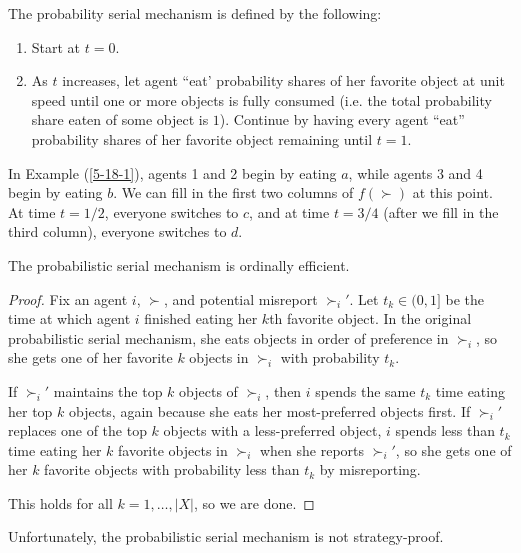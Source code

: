 \begin{definition}
	The probability serial mechanism is defined by the following:
	\begin{enumerate}[label = (\roman*)]
		\item Start at $t=0$. 
		\item As $t$ increases, let agent ``eat' probability shares of her favorite object at unit speed until one or more objects is fully consumed (i.e. the total probability share eaten of some object is $1$). Continue by having every agent ``eat'' probability shares of her favorite object remaining until $t=1$.
	\end{enumerate}
\end{definition}

In Example (\ref{5-18-1}), agents 1 and 2 begin by eating $a$, while agents 3 and 4 begin by eating $b$. We can fill in the first two columns of $f(\succ)$ at this point. At time $t=1 /2$, everyone switches to $c$, and at time $t = 3 / 4$ (after we fill in the third column), everyone switches to $d$.
\begin{proposition}
	The probabilistic serial mechanism is ordinally efficient.
\end{proposition}
\begin{proof}
	Fix an agent $i$, $\succ$, and potential misreport $\succ_i'$. 
	Let $t_k \in (0,1]$ be the time at which agent $i$ finished eating her $k$th favorite object.
	In the original probabilistic serial mechanism, she eats objects in order of preference in $\succ_i$, so she gets one of her favorite $k$ objects in $\succ_i$ with probability $t_k$.

	If $\succ_i'$ maintains the top $k$ objects of $\succ_i$, then $i$ spends the same $t_k$ time eating her top $k$ objects, again because she eats her most-preferred objects first.
	If $\succ_i'$ replaces one of the top $k$ objects with a less-preferred object, $i$ spends less than $t_k$ time eating her $k$ favorite objects in $\succ_i$ when she reports $\succ_i'$, so she gets one of her $k$ favorite objects with probability less than $t_k$ by misreporting.

	This holds for all $k = 1,\ldots,\left| X \right|$, so we are done.
\end{proof}

Unfortunately, the probabilistic serial mechanism is not strategy-proof.

